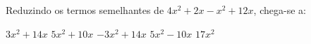 Reduzindo os termos semelhantes de $4x^2+2x-x^2+12x$, chega-se a:

$3x^2+14x$
$5x^2+10x$
$-3x^2+14x$
$5x^2-10x$
$17x^2$



